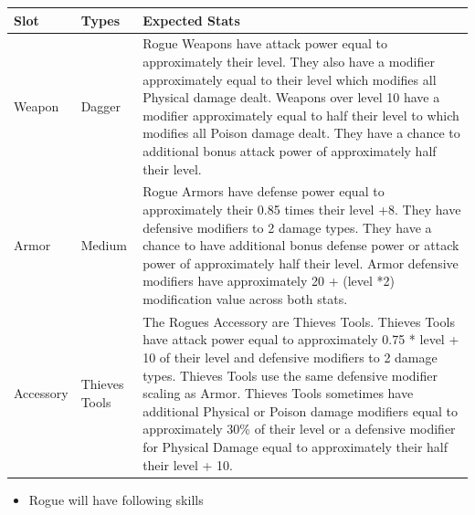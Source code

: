 \documentclass[12pt]{article} %
\begin{document}
\begin{footnotesize}
\begin{center}
\begin{tabular}{ | m{2cm} | m{2cm} | m{10cm} | }
\hline
Slot & Types & Expected Stats \\
\hline
Weapon & Dagger & Rogue Weapons have attack power equal to approximately their level. They also have a modifier approximately equal to their level which modifies all Physical damage dealt. Weapons over level 10 have a modifier approximately equal to half their level to which modifies all Poison damage dealt. They have a chance to additional bonus attack power of approximately half their level.\\
\hline
Armor & Medium & Rogue Armors have defense power equal to approximately their 0.85 times their level +8. They have defensive modifiers to 2 damage types. They have a chance to have additional bonus defense power or attack power of approximately half their level. Armor defensive modifiers have approximately 20 + (level *2) modification value across both stats.\\
\hline
Accessory & Thieves Tools & The Rogues Accessory are Thieves Tools. Thieves Tools have attack power equal to approximately 0.75 * level + 10 of their level and defensive modifiers to 2 damage types. Thieves Tools use the same defensive modifier scaling as Armor. Thieves Tools sometimes have additional Physical or Poison damage modifiers equal to approximately 30\% of their level or a defensive modifier for Physical Damage equal to approximately their half their level + 10.\\
\hline
\end{tabular}
\end{center}
\end{footnotesize}

\begin{itemize}
    \item Rogue will have following skills
\end{itemize}
\end{document}
